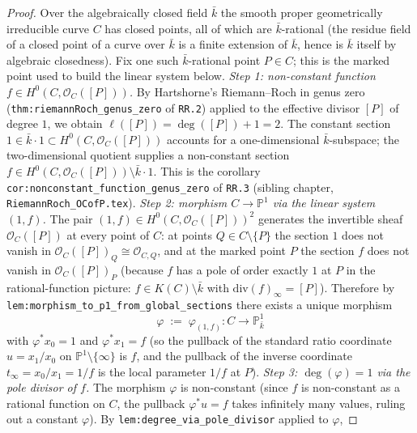 \begin{proof}
  Over the algebraically closed field \(\bar k\) the smooth proper
  geometrically irreducible curve \(C\) has closed points, all of which are
  \(\bar k\)-rational (the residue field of a closed point of a curve over
  \(\bar k\) is a finite extension of \(\bar k\), hence is \(\bar k\) itself by
  algebraic closedness). Fix one such \(\bar k\)-rational point \(P \in C\);
  this is the marked point used to build the linear system below.
  \emph{Step 1: non-constant function \(f \in H^0(C, \mathcal O_C([P]))\).}
  By Hartshorne's Riemann--Roch in genus zero
  (\texttt{thm:riemannRoch_genus_zero} of \texttt{RR.2}) applied to the
  effective divisor \([P]\) of degree \(1\), we obtain
  \(\ell([P]) = \deg([P]) + 1 = 2\). The constant section
  \(1 \in \bar k \cdot 1 \subset H^0(C, \mathcal O_C([P]))\) accounts for a
  one-dimensional \(\bar k\)-subspace; the two-dimensional quotient supplies
  a non-constant section $f \in H^0(C, \mathcal O_C([P])) \setminus
  \bar k \cdot 1$. This is the corollary
  \texttt{cor:nonconstant\_function\_genus\_zero} of \texttt{RR.3} (sibling
  chapter, \texttt{RiemannRoch\_OCofP.tex}).
  \emph{Step 2: morphism \(C \to \mathbb P^1\) via the linear system \((1, f)\).}
  The pair \((1, f) \in H^0(C, \mathcal O_C([P]))^2\) generates the
  invertible sheaf \(\mathcal O_C([P])\) at every point of \(C\): at points
  \(Q \in C \setminus \{P\}\) the section \(1\) does not vanish in
  \(\mathcal O_C([P])_Q \cong \mathcal O_{C, Q}\), and at the marked point
  \(P\) the section \(f\) does not vanish in \(\mathcal O_C([P])_P\) (because \(f\)
  has a pole of order exactly \(1\) at \(P\) in the rational-function
  picture: \(f \in K(C) \setminus \bar k\) with \(\mathrm{div}(f)_\infty = [P]\)).
  Therefore by \texttt{lem:morphism_to_p1_from_global_sections} there
  exists a unique morphism
  \[
    \varphi \;:=\; \varphi_{(1, f)} \colon C \longrightarrow \mathbb P^1_{\bar k}
  \]
  with \(\varphi^* x_0 = 1\) and \(\varphi^* x_1 = f\) (so the pullback of
  the standard ratio coordinate \(u = x_1 / x_0\) on $\mathbb P^1 \setminus
  \{\infty\}$ is $f$, and the pullback of the inverse coordinate
  \(t_\infty = x_0 / x_1 = 1 / f\) is the local parameter \(1/f\) at \(P\)).
  \emph{Step 3: \(\deg(\varphi) = 1\) via the pole divisor of \(f\).} The
  morphism \(\varphi\) is non-constant (since \(f\) is non-constant as a
  rational function on \(C\), the pullback \(\varphi^* u = f\) takes
  infinitely many values, ruling out a constant \(\varphi\)). By
  \texttt{lem:degree_via_pole_divisor} applied to \(\varphi\),

\end{proof}

